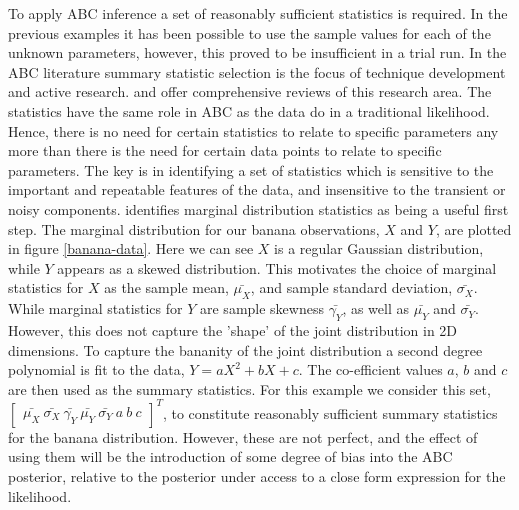 To apply ABC inference a set of reasonably sufficient statistics is required. In the previous examples it has been possible to use the sample values for each of the unknown parameters, however, this proved to be insufficient in a trial run. In the ABC literature summary statistic selection is the focus of technique development and active research. \citet{Blum2013} and \citet{Prangle2017} offer comprehensive reviews of this research area. The statistics have the same role in ABC as the data do in a traditional likelihood. Hence, there is no need for certain statistics to relate to specific parameters any more than there is the need for certain data points to relate to specific parameters. The key is in identifying a set of statistics which is sensitive to the important and repeatable features of the data, and insensitive to the transient or noisy components. \citet{Wood2010} identifies marginal distribution statistics as being a useful first step. The marginal distribution for our banana observations, $X$ and $Y$, are plotted in figure \ref{banana-data}. Here we can see $X$ is a regular Gaussian distribution, while $Y$ appears as a skewed distribution. This motivates the choice of marginal statistics for $X$ as the sample mean, $\bar{\mu_X}$, and sample standard deviation, $\bar{\sigma_X}$. While marginal statistics for $Y$ are sample skewness $\bar{\gamma_Y}$, as well as $\bar{\mu_Y}$ and $\bar{\sigma_Y}$. However, this does not capture the 'shape' of the joint distribution in 2D dimensions. To capture the bananity of the joint distribution a second degree polynomial is fit to the data, $Y = aX^2 + bX + c$. The co-efficient values $a$, $b$ and $c$ are then used as the summary statistics. For this example we consider this set, $\begin{bmatrix}
\bar{\mu_X}\ \bar{\sigma_X}\ \bar{\gamma_Y}\ \bar{\mu_Y}\ \bar{\sigma_Y}\ a\ b\ c
\end{bmatrix}^T$, to constitute reasonably sufficient summary statistics for the banana distribution. However, these are not perfect, and the effect of using them will be the introduction of some degree of bias into the ABC posterior, relative to the posterior under access to a close form expression for the likelihood. \par

